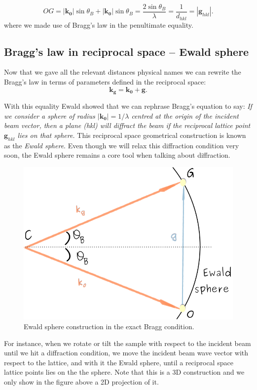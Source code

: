 \begin{equation*}
OG = |\mathbf{k_0}|\sin{\theta_B} + |\mathbf{k_0}|\sin{\theta_B} =\frac{2\sin{\theta_B}}{\lambda}=\frac{1}{d_{hkl}}=|\mathbf{g}_{hkl}|.
\end{equation*}
where we made use of Bragg's law in the penultimate equality.





\subsection{Bragg's law in reciprocal space -- Ewald sphere}
\label{sec:Ewald}
Now that we gave all the relevant distances physical names we can rewrite the Bragg's law in terms of parameters defined in the reciprocal space:
\begin{equation}
\label{eq:Bragg1}
    \mathbf{k_g}=\mathbf{k_0}+\mathbf{g}.
\end{equation}

With this equality Ewald showed that we can rephrase Bragg's equation to say: \textit{If we consider a sphere of radius $|\mathbf{k_0}|=1/\lambda$ centred at the origin of the incident beam vector, then a plane \hkl(hkl) will diffract the beam if the reciprocal lattice point $\mathbf{g}_{hkl}$ lies on that sphere.} This reciprocal space geometrical construction is known as the \textit{Ewald sphere}.  Even though we will relax this diffraction condition very soon, the Ewald sphere remains a core tool when talking about diffraction. 

 \begin{figure}
    \centering
\includegraphics[width=0.52\linewidth]{Figures/EwaldSphere.png}
\caption{Ewald sphere construction in the exact Bragg condition. }
\label{Fig:Ewald}
\end{figure}

For instance, when we rotate or tilt the sample with respect to the incident beam until we hit a diffraction condition, we move the incident beam wave vector with respect to the lattice, and with it the Ewald sphere, until  a reciprocal space lattice points lies on the the sphere. Note that this is a 3D construction and we only show in the figure above a 2D projection of it.

